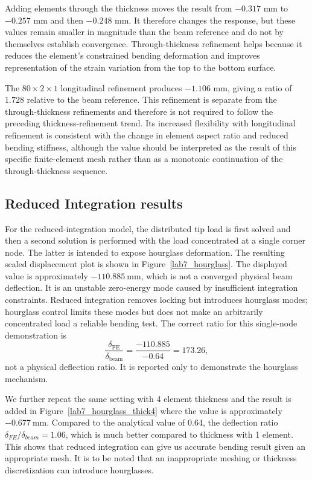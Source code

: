 Adding elements through the thickness moves the result from
\(-0.317\) mm to \(-0.257\) mm and then \(-0.248\) mm. It therefore changes
the response, but these values remain smaller in magnitude than the beam
reference and do not by themselves establish convergence. Through-thickness
refinement helps because it reduces the element's constrained bending
deformation and improves representation of the strain variation from the
top to the bottom surface.

The \(80\times2\times1\) longitudinal refinement produces
\(-1.106\) mm, giving a ratio of \(1.728\) relative to the beam reference.
This refinement is separate from the through-thickness refinements and
therefore is not required to follow the preceding thickness-refinement
trend. Its increased flexibility with longitudinal refinement is consistent
with the change in element aspect ratio and reduced bending stiffness,
although the value should be interpreted as the result of this specific
finite-element mesh rather than as a monotonic continuation of the
through-thickness sequence.

\subsection{Reduced Integration results}

For the reduced-integration model, the distributed tip load is first solved
and then a second solution is performed with the load concentrated at a
single corner node. The latter is intended to expose hourglass deformation.
The resulting scaled displacement plot is shown in
Figure~\ref{lab7_hourglass}. The displayed value is approximately
\(-\SI{110.885}{\milli\metre}\), which is not a converged physical beam
deflection. It is an unstable zero-energy mode caused by insufficient
integration constraints. Reduced integration removes locking but introduces
hourglass modes; hourglass control limits these modes but does not make an
arbitrarily concentrated load a reliable bending test. The correct ratio for
this single-node demonstration is
\[
\frac{\delta_{\mathrm{FE}}}{\delta_{\mathrm{beam}}}
=\frac{-110.885}{-0.64}=173.26,
\]
not a physical deflection ratio. It is reported only to demonstrate the
hourglass mechanism.

We further repeat the same setting with 4 element thickness and the result is added in Figure~\ref{lab7_hourglass_thick4} where the value is approximately
\(-\SI{0.677}{\milli\metre}\). Compared to the analytical value of 0.64, the deflection ratio $\delta_{FE} / \delta_{beam} = 1.06$, which is much better compared to thickness with 1 element. This shows that reduced integration can give us accurate bending result given an appropriate mesh. It is to be noted that an inappropriate meshing or thickness discretization can introduce hourglasses. 

